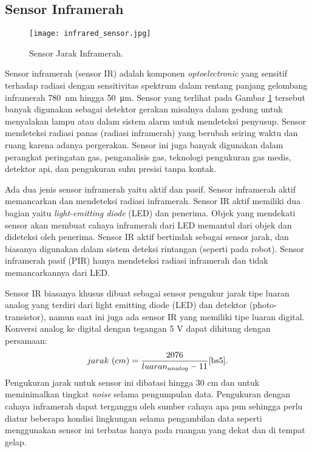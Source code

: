     \subsection{Sensor Inframerah}
    \label{subsec:Infrared}

    \begin{figure}[H]
        \centering
        \texttt{[image: infrared\_sensor.jpg]}
        \caption{Sensor Jarak Inframerah\cite{bs3}.}
        \label{fig:Ch02_inframerah}
    \end{figure}

    Sensor inframerah (sensor IR) adalah komponen \textit{optoelectronic} yang sensitif terhadap radiasi dengan sensitivitas spektrum dalam rentang panjang gelombang inframerah \SI{780}{\nano\metre} hingga \SI{50}{\micro\metre}\cite{bs4}. 
    Sensor yang terlihat pada Gambar \ref{fig:Ch02_inframerah} tersebut banyak digunakan sebagai detektor gerakan misalnya dalam gedung untuk menyalakan lampu atau dalam sistem alarm untuk mendeteksi penyusup. Sensor mendeteksi radiasi panas (radiasi inframerah) yang berubah seiring waktu dan ruang karena adanya pergerakan. Sensor ini juga banyak digunakan dalam perangkat peringatan gas, penganalisis gas, teknologi pengukuran gas medis, detektor api, dan pengukuran suhu presisi tanpa kontak. 

    Ada dua jenis sensor inframerah yaitu aktif dan pasif\cite{bs5}. Sensor inframerah aktif memancarkan dan mendeteksi radiasi inframerah. Sensor IR aktif memiliki dua bagian yaitu \textit{light-emitting diode} (LED) dan penerima. Objek yang mendekati sensor akan membuat cahaya inframerah dari LED memantul dari objek dan dideteksi oleh penerima. Sensor IR aktif bertindak sebagai sensor jarak, dan biasanya digunakan dalam sistem deteksi rintangan (seperti pada robot). Sensor inframerah pasif (PIR) hanya mendeteksi radiasi inframerah dan tidak memancarkannya dari LED.

    Sensor IR biasanya khusus dibuat sebagai sensor pengukur jarak tipe luaran analog yang terdiri dari light emitting diode (LED) dan detektor (photo-transistor), namun saat ini juga ada sensor IR yang memiliki tipe luaran digital. Konversi analog ke digital dengan tegangan 5 V dapat dihitung dengan persamaan:
    \begin{equation}
        \label{eqs: konversi_IR}
        jarak\ (cm)= \frac{2076}{luaran_{analog}-11}\cite{bs5}.
    \end{equation}
    Pengukuran jarak untuk sensor ini dibatasi hingga $30$ cm dan untuk meminimalkan tingkat \textit{noise} selama pengumpulan data. Pengukuran dengan cahaya inframerah dapat terganggu oleh sumber cahaya apa pun sehingga perlu diatur beberapa kondisi lingkungan selama pengambilan data seperti menggunakan sensor ini terbatas hanya pada ruangan yang dekat dan di tempat gelap\cite{bs6}.


